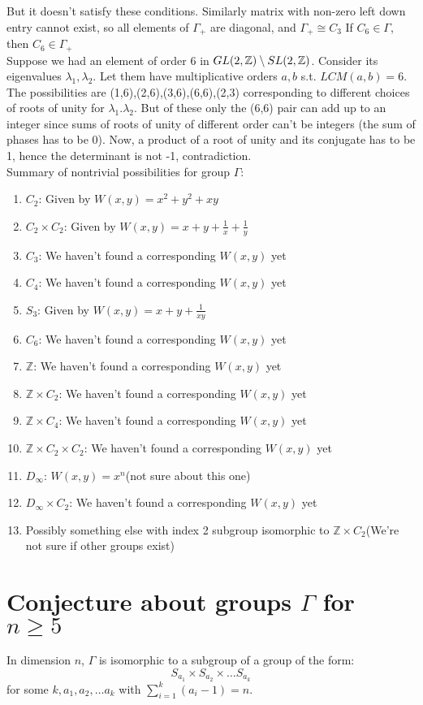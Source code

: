 \documentclass[a4paper]{article}
\begin{document}
    But it doesn't satisfy these conditions.
    Similarly matrix with non-zero left down entry cannot exist, so all elements of $\Gamma_+$ are diagonal, and $\Gamma_+ \cong C_3$
    \clm If $C_6 \in \Gamma$, then $C_6\in \Gamma_+$\\
    Suppose we had an element of order 6 in $GL(2,\mathbb{Z})\setminus SL(2,\mathbb{Z})$. Consider its eigenvalues $\lambda_1,\lambda_2$. Let them have multiplicative orders $a,b$ s.t. $LCM(a,b)=6$. The possibilities are (1,6),(2,6),(3,6),(6,6),(2,3) corresponding to different choices of roots of unity for  $\lambda_1.\lambda_2$. But of these only the (6,6) pair can add up to an integer since sums of roots of unity of different order can't be integers (the sum of phases has to be 0). Now, a product of a root of unity and its conjugate has to be 1, hence the determinant is not -1, contradiction.\\
    
    Summary of nontrivial possibilities for group $\Gamma$:
    \begin{enumerate}
    	\item $C_2$: Given by $W(x,y) = x^2 + y^2+ x y$ 
    	\item $C_2 \times C_2$: Given by $W(x,y) = x+ y +\frac{1}{x}+\frac{1}{y}$
    	\item $C_3$: We haven't found a corresponding $W(x,y)$ yet
    	\item $C_4$: We haven't found a corresponding $W(x,y)$ yet
    	\item $S_3$: Given by $W(x,y) = x + y +\frac{1}{xy}$
    	\item $C_6$: We haven't found a corresponding $W(x,y)$ yet
    	\item $\mathbb{Z}$: We haven't found a corresponding $W(x,y)$ yet
    	\item $\mathbb{Z} \times C_2$: We haven't found a corresponding $W(x,y)$ yet
    	\item $\mathbb{Z} \times C_4$: We haven't found a corresponding $W(x,y)$ yet
    	\item $\mathbb{Z} \times C_2 \times C_2$: We haven't found a corresponding $W(x,y)$ yet
    	\item $D_\infty$: $W(x,y) = x^n$(not sure about this one)
    	\item $D_\infty \times C_2$: We haven't found a corresponding $W(x,y)$ yet
    	\item Possibly something else with index 2 subgroup isomorphic to $\mathbb{Z} \times C_2$(We're not sure if other groups exist)
    \end{enumerate}
	\section{Conjecture about groups $\Gamma$ for $n \geq 5$}
		In dimension $n$, $\Gamma$ is isomorphic to a subgroup of a group of the form:
		$$S_{a_1} \times S_{a_2} \times \dots S_{a_k}$$ for some $k, a_1, a_2, \dots a_k$ with $\sum_{i=1}^k (a_i - 1) = n$.
\end{document}
